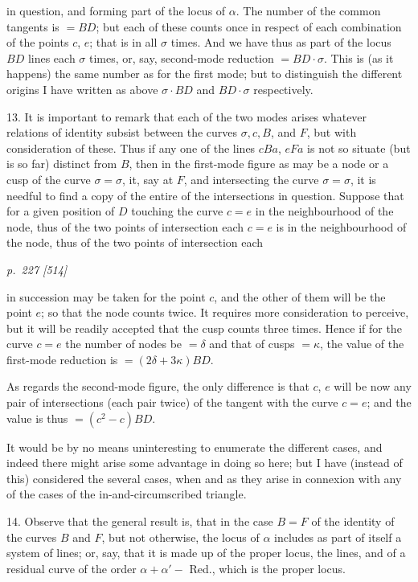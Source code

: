 \documentclass[11pt,a4paper]{book}
\begin{document}
in question, and forming part of the locus of $\alpha$.  The number of the common tangents
is $=BD$; but each of these counts once in respect of each combination of the points
$c$, $e$; that is in all $\sigma$ times.  And we have thus as part of the locus $BD$ lines each
$\sigma$ times, or, say, second-mode reduction $=BD\cdot \sigma$.  This is (as it happens) the
same number as for the first mode; but to distinguish the different origins I have
written as above $\sigma\cdot BD$ and $BD\cdot \sigma$ respectively.

13. It is important to remark that each of the two modes arises whatever
relations of identity subsist between the curves $\sigma, c, B$, and $F$, but with consideration of these.  Thus if any one of the lines $cBa$, $eFa$ is not so situate (but is so far) distinct
from $B$, then in the first-mode figure as may be a node or a cusp of the curve $\sigma=\sigma$,
it, say at $F$, and intersecting the curve $\sigma=\sigma$, it is needful to find a copy of the entire
of the intersections in question.  Suppose that for a given position of $D$ touching the curve
$c=e$ in the neighbourhood of the node, thus of the two points of intersection each
$c=e$ is in the neighbourhood of the node, thus of the two points of intersection each

\clearpage

\bigskip
\textit{p.~227 [514]}
\smallskip

in succession may be taken for the point $c$, and the other of them will be the
point $e$; so that the node counts twice.  It requires more consideration to perceive,
but it will be readily accepted that the cusp counts three times.  Hence if for the
curve $c=e$ the number of nodes be $=\delta$ and that of cusps $=\kappa$, the value of the
first-mode reduction is $=(2\delta+3\kappa)BD$.

As regards the second-mode figure, the only difference is that $c$, $e$ will be now
any pair of intersections (each pair twice) of the tangent with the curve $c=e$; and
the value is thus $=(c^2-c)BD$.

It would be by no means uninteresting to enumerate the different cases, and indeed
there might arise some advantage in doing so here; but I have (instead of this) considered
the several cases, when and as they arise in connexion with any of the cases of the
in-and-circumscribed triangle.

14. Observe that the general result is, that in the case $B=F$ of the identity
of the curves $B$ and $F$, but not otherwise, the locus of $\alpha$ includes as part of itself
a system of lines; or, say, that it is made up of the proper locus, the lines, and of a residual curve
of the order $\alpha + \alpha' - $ Red., which is the proper locus.
\end{document}
